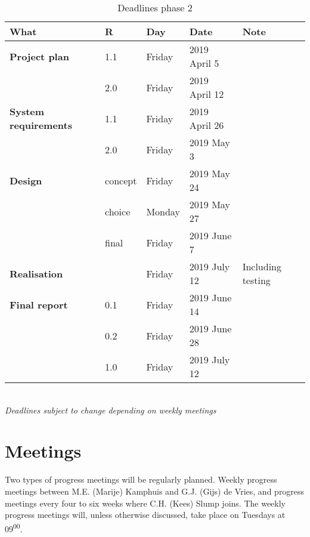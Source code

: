 \begin{table}[h!]
	\begin{tabular}{l|llll}
		\textbf{What} 		&	R	& 	Day	&	Date	&	Note \\
		\hline
		\textbf{Project plan}& 1.1	& Friday 		& 2019 April 5	&	 \\
		\rowcolor{Gray}
		 	&	2.0 	&	 Friday & 2019 April 12 & \\
		 	\hline
		\textbf{System requirements} & 1.1 & Friday & 2019 April 26 & \\
		\rowcolor{Gray}
		 & 2.0 & Friday & 2019 May 3 & \\
		\hline
		\textbf{Design} & concept & Friday & 2019 May 24 & \\
		\rowcolor{Gray}
		 & choice & Monday & 2019 May 27 &  \\
		 & final  & Friday & 2019 June 7 & \\
		 \rowcolor{Gray}
		 \hline
		 \textbf{Realisation} & & Friday & 2019 July 12 & Including testing\\
		 \hline
		 \textbf{Final report} & 0.1 & Friday & 2019 June 14 & \\
		 \rowcolor{Gray}
		 & 0.2 & Friday & 2019 June 28 & \\
		 & 1.0 & Friday & 2019 July 12 & \\
		 \hline
	\end{tabular} \\
	\textit{Deadlines subject to change depending on weekly meetings}
	\caption{Deadlines phase 2}
	\label{tab:deadlines2}
\end{table}

\section{Meetings}
Two types of progress meetings will be regularly planned. Weekly progress meetings between M.E. (Marije) Kamphuis and G.J. (Gijs) de Vries, and progress meetings every four to six weeks where C.H. (Kees) Slump joins. The weekly progress meetings will, unless otherwise discussed, take place on Tuesdays at 09\textsuperscript{00}.


